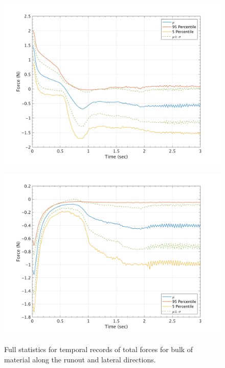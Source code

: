 \documentclass{article}
\begin{document}
\begin{figure}[H]
        \begin{minipage}[b]{0.5\linewidth}
                \centering
                \includegraphics[width=1\textwidth]{InclinedPlane/GlobalRecords/V_Global_Fx.png}
                \label{fig:Ramp-SP-Fx-V}
        \end{minipage}
        \begin{minipage}[b]{0.5\linewidth}
                \centering
                \includegraphics[width=1\textwidth]{InclinedPlane/GlobalRecords/V_Global_Fy.png}
                \label{fig:Ramp-SP-Fy-V}
        \end{minipage}
        \caption{Full statistics for temporal records of total forces for bulk of material along the runout and lateral directions.}
        \label{fig:Ramp-SP-F}
\end{figure}
\end{document}
